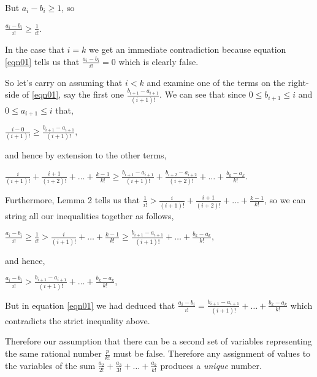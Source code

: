 \documentclass{article}
\begin{document}
But \(a_i - b_i \ge{} 1\), so

\begin{center}
\(\frac{a_i - b_i}{i!} \ge{} \frac{1}{i!}\).
\end{center}

In the case that \(i = k\) we get an immediate contradiction because 
equation \eqref{eqn01} tells us that \(\frac{a_i - b_i}{i!} = 0\) which is
clearly false.

So let's carry on assuming that \(i < k\) and examine
one of the terms
on the right-side of \eqref{eqn01}, say
the first one \(\frac{b_{i+1} - a_{i+1}}{(i+1)!}\). We can see that since
\(0 \le b_{i+1} \le{} i\) and \(0 \le a_{i+1} \le{} i\) that,

\begin{center}
\(\frac{i - 0}{(i+1)!} \ge{} \frac{b_{i+1} - a_{i+1}}{(i+1)!}\),
\end{center}

and hence by extension to the other terms,

\begin{center}
\(
\frac{i}{(i+1)!}
+ \frac{i+1}{(i+2)!}
+ \dots{} + \frac{k-1}{k!} \ge{}
\frac{b_{i+1} - a_{i+1}}{(i+1)!}
+ \frac{b_{i+2} - a_{i+2}}{(i+2)!}
+ \dots{} + \frac{b_k - a_k}{k!}\).
\end{center}

Furthermore, Lemma 2 tells us that \(\frac{1}{i!} > 
\frac{i}{(i+1)!}
+ \frac{i+1}{(i+2)!}
+ \dots{} + \frac{k-1}{k!}\), so
we can string all our inequalities together as follows,

\begin{center}
\(\frac{a_i - b_i}{i!} \ge{} \frac{1}{i!} > \frac{i}{(i+1)!} + \dots{} + \frac{k-1}{k!} \ge{} \frac{b_{i+1} - a_{i+1}}{(i+1)!} + \dots{} + \frac{b_k - a_k}{k!}\),
\end{center}

and hence,

\begin{center}
\(\frac{a_i - b_i}{i!} > \frac{b_{i+1} - a_{i+1}}{(i+1)!} + \dots{} + \frac{b_k - a_k}{k!}\),
\end{center}

But in equation \eqref{eqn01} we had deduced
that \(\frac{a_i - b_i}{i!} = \frac{b_{i+1} - a_{i+1}}{(i+1)!} + \dots{} + \frac{b_k - a_k}{k!}\)
which contradicts the strict inequality above.

Therefore our assumption that there can be a second set
of variables representing the same rational number \(\frac{p}{k!}\) must be false.
Therefore any assignment of values to the variables of the sum
\(\frac{a_2}{2!} + \frac{a_3}{3!} + \dots{} + \frac{a_k}{k!}\)
produces a \emph{unique} number.
\end{document}
